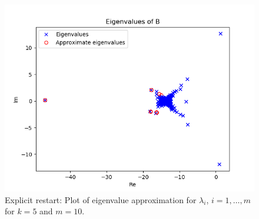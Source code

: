\begin{figure}[h!]
\centering
\includegraphics[scale=0.8]{../task7/task7a3_k5m10.png}
\caption{Explicit restart: Plot of eigenvalue approximation for $\lambda_{i}$, $i = 1,\ldots,m$ for $k = 5$ and $m=10$.}
\label{fig:task7a2k5}
\end{figure}



